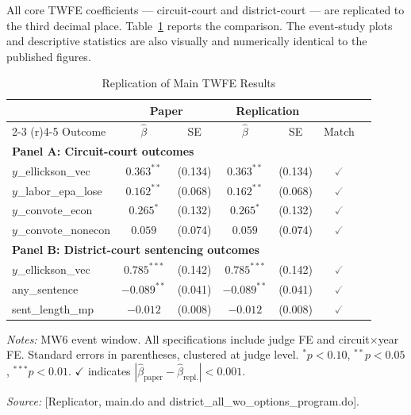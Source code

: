 \documentclass[12pt,a4paper]{article}
\newcommand{\match}{\textcolor{gray}{$\checkmark$}}
\begin{document}
All core TWFE coefficients --- circuit-court and district-court --- are replicated to the third decimal place. Table~\ref{tab:main_replication} reports the comparison. The event-study plots and descriptive statistics are also visually and numerically identical to the published figures.

\begin{table}[htbp]
\centering
\caption{Replication of Main TWFE Results}
\label{tab:main_replication}
\begin{threeparttable}
\begin{tabular}{lcccccl}
\toprule
& \multicolumn{2}{c}{Paper} & \multicolumn{2}{c}{Replication} & \\
\cmidrule(r){2-3} \cmidrule(r){4-5}
Outcome & $\hat{\beta}$ & SE & $\hat{\beta}$ & SE & Match \\
\midrule
\multicolumn{7}{l}{\textbf{Panel A: Circuit-court outcomes}} \\
$y$\_ellickson\_vec & $0.363^{**}$ & (0.134) & $0.363^{**}$ & (0.134) & \match \\
$y$\_labor\_epa\_lose & $0.162^{**}$ & (0.068) & $0.162^{**}$ & (0.068) & \match \\
$y$\_convote\_econ & $0.265^{*}$ & (0.132) & $0.265^{*}$ & (0.132) & \match \\
$y$\_convote\_nonecon & $0.059$ & (0.074) & $0.059$ & (0.074) & \match \\
\midrule
\multicolumn{7}{l}{\textbf{Panel B: District-court sentencing outcomes}} \\
$y$\_ellickson\_vec & $0.785^{***}$ & (0.142) & $0.785^{***}$ & (0.142) & \match \\
any\_sentence & $-0.089^{**}$ & (0.041) & $-0.089^{**}$ & (0.041) & \match \\
sent\_length\_mp & $-0.012$ & (0.008) & $-0.012$ & (0.008) & \match \\
\bottomrule
\end{tabular}
\begin{tablenotes}
\item {\small \textit{Notes:} MW6 event window. All specifications include judge FE and circuit$\times$year FE. Standard errors in parentheses, clustered at judge level. $^{*}p<0.10$, $^{**}p<0.05$, $^{***}p<0.01$. $\checkmark$ indicates $|\hat{\beta}_{\text{paper}} - \hat{\beta}_{\text{repl.}}| < 0.001$.}
\item {\small \textit{Source:} [Replicator, main.do and district\_all\_wo\_options\_program.do].}
\end{tablenotes}
\end{threeparttable}
\end{table}
\end{document}
